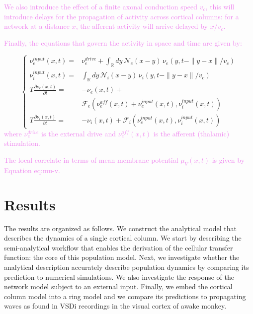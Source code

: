 \documentclass[8pt, colorlinks, a4paper]{article}
\renewcommand\ref{}
\newcommand{\corr}[1]{{\textcolor{violet}{#1}}}
\begin{document}
\corr{We also introduce the effect of a finite axonal conduction speed
\(v_c\), this will introduce delays for the propagation of activity
across cortical columns: for a network at a distance \(x\), the
afferent activity will arrive delayed by \(x/v_c\).}

\corr{Finally, the equations that govern the activity in space and time are
given by:}

\begin{equation}
\left\{
\begin{split}
\nu_e^{input}(x,t) = &\nu_e^{drive}  + 
\int_\mathbb{R} dy \, \mathcal{N}_e(x-y) \, \nu_e(y, t-\|y-x\|/v_c) \\
\nu_i^{input}(x,t) = & \int_\mathbb{R} dy \, \mathcal{N}_i(x-y) \, \nu_i(y, t-\|y-x\|/v_c) \\
T \frac{\partial \nu_e(x,t)}{\partial t} = & -  \nu_e(x,t) + \\
& \mathcal{F}_e(\nu_e^{aff}(x,t)+\nu_e^{input}(x,t), \nu_i^{input}(x,t) ) \\
T \frac{\partial \nu_i(x,t)}{\partial t} = & -  \nu_i(x,t) + \mathcal{F}_i(\nu_e^{input}(x,t), \nu_i^{input}(x,t) )
\end{split}
\right.
\end{equation}
\corr{where \(\nu_e^{drive}\) is the external drive and \(\nu_e^{aff}(x,t)\)
is the afferent (thalamic) stimulation.}

\corr{The local correlate in terms of mean membrane potential \(\mu_V(x,t)\)
is given by Equation \ref{eq:mu-v}.}




\section{Results}
\label{sec-4}
\normalsize

The results are organized as follows. We construct the analytical
model that describes the dynamics of a single cortical column. We
start by describing the semi-analytical workflow that enables the
derivation of the cellular transfer function: the core of this
population model. Next, we investigate whether the analytical
description accurately describe population dynamics by comparing its
prediction to numerical simulations. We also investigate the response
of the network model subject to an external input. Finally, we embed
the cortical column model into a ring model and we compare its
predictions to propagating waves as found in VSDi recordings in the
visual cortex of awake monkey.
\end{document}
